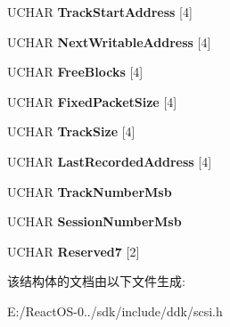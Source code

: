 \begin{DoxyCompactItemize}
U\+C\+H\+AR {\bfseries Track\+Start\+Address} \mbox{[}4\mbox{]}
\item 
\mbox{\label{struct___t_r_a_c_k___i_n_f_o_r_m_a_t_i_o_n2_a933b45aefd95e1561d42ead4a176b9b7}} 
U\+C\+H\+AR {\bfseries Next\+Writable\+Address} \mbox{[}4\mbox{]}
\item 
\mbox{\label{struct___t_r_a_c_k___i_n_f_o_r_m_a_t_i_o_n2_acab1876cee0b4f618ec5d2c170ba145f}} 
U\+C\+H\+AR {\bfseries Free\+Blocks} \mbox{[}4\mbox{]}
\item 
\mbox{\label{struct___t_r_a_c_k___i_n_f_o_r_m_a_t_i_o_n2_afe186070f62b23f57077efc489bd4e1f}} 
U\+C\+H\+AR {\bfseries Fixed\+Packet\+Size} \mbox{[}4\mbox{]}
\item 
\mbox{\label{struct___t_r_a_c_k___i_n_f_o_r_m_a_t_i_o_n2_a223a3c13efa2287cb1ab7c38fec554bc}} 
U\+C\+H\+AR {\bfseries Track\+Size} \mbox{[}4\mbox{]}
\item 
\mbox{\label{struct___t_r_a_c_k___i_n_f_o_r_m_a_t_i_o_n2_a44774978d2539adb8296aa5dc1910639}} 
U\+C\+H\+AR {\bfseries Last\+Recorded\+Address} \mbox{[}4\mbox{]}
\item 
\mbox{\label{struct___t_r_a_c_k___i_n_f_o_r_m_a_t_i_o_n2_a6bd735cbac33236fef97a0dbffdfc3e9}} 
U\+C\+H\+AR {\bfseries Track\+Number\+Msb}
\item 
\mbox{\label{struct___t_r_a_c_k___i_n_f_o_r_m_a_t_i_o_n2_af0971df27906e0a5b1fd3ecffd64b4a2}} 
U\+C\+H\+AR {\bfseries Session\+Number\+Msb}
\item 
\mbox{\label{struct___t_r_a_c_k___i_n_f_o_r_m_a_t_i_o_n2_a3613cd837e70daf22722783471b12e3d}} 
U\+C\+H\+AR {\bfseries Reserved7} \mbox{[}2\mbox{]}
\end{DoxyCompactItemize}


该结构体的文档由以下文件生成\+:\begin{DoxyCompactItemize}
\item 
E\+:/\+React\+O\+S-\/0../sdk/include/ddk/scsi.\+h\end{DoxyCompactItemize}
